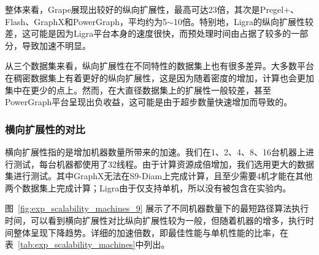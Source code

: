 整体来看，Grape展现出较好的纵向扩展性，最高可达23倍，其次是Pregel+、Flash、GraphX和PowerGraph，平均约为5$\sim$10倍。特别地，Ligra的纵向扩展性较差，这可能是因为Ligra平台本身的速度很快，而预处理时间由占据了较多的一部分，导致加速不明显。

从三个数据集来看，纵向扩展性在不同特性的数据集上也有很多差异。大多数平台在稠密数据集上有着更好的纵向扩展性，这是因为随着密度的增加，计算也会更加集中在更少的点上。然而，在大直径数据集上的扩展性一般较差，甚至PowerGraph平台呈现出负收益，这可能是由于超步数量快速增加而导致的。


\subsubsection{横向扩展性的对比}

横向扩展性指的是增加机器数量所带来的加速。我们在1、2、4、8、16台机器上进行测试，每台机器都使用了32线程。由于计算资源成倍增加，我们选用更大的数据集进行测试。其中GraphX无法在S9-Diam上完成计算，且至少需要4机才能在其他两个数据集上完成计算；Ligra由于仅支持单机，所以没有被包含在实验内。

图~\ref{fig:exp_scalability_machines_9} 展示了不同机器数量下的最短路径算法执行时间，可以看到横向扩展性对比纵向扩展性较为一般，但随着机器的增多，执行时间整体呈现下降趋势。详细的加速倍数，即最佳性能与单机性能的比率，在表~\ref{tab:exp_scalability_machines}中列出。

\begin{table}[h]\centering
    \def\arraystretch{1.5}
   \caption{横向扩展性加速倍数}
   \label{tab:exp_scalability_machines}
   \tiny
\end{table}

